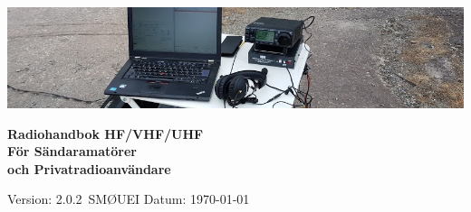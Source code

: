 \newcommand{\TitleText}{Radiohandbok HF/VHF/UHF}
\newcommand{\SubtitleText}{För Sändaramatörer\\ och Privatradioanvändare}
\newcommand{\Forfattare}{Täpp-Anders Sikvall}
\newcommand{\Initialer}{SMØUEI}
\newcommand{\DokYear}{19}
\newcommand{\DokVersion}{2.0.2}
\newcommand{\DokumentRevision}{x.y.z}
\newcommand{\DokumentDatum}{\today}


\renewcommand{\arraystretch}{1.15}

\titlefoottrue %



	

\pagestyle{empty}
\vfill
\vspace*{4cm}
\centerline{\includegraphics[width=\paperwidth]{logo/rubrikbild}}
\begin{flushright}
	\Huge{\bfseries{\TitleText}} \\[3mm]
	\Large{\bfseries{\SubtitleText}}
\end{flushright}

\vfill

Version: \DokVersion\ \hfill SMØUEI \hfill Datum: \DokumentDatum

